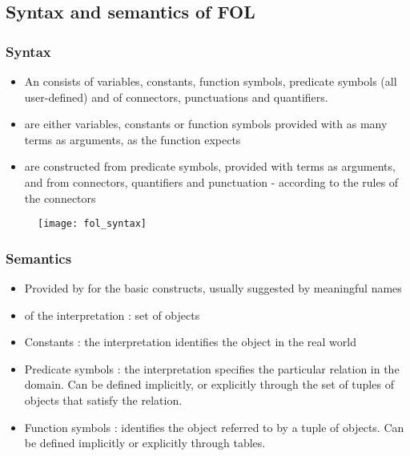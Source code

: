 \subsection{Syntax and semantics of FOL}

\subsubsection{Syntax}

\begin{minipage}{0.52\textwidth}
	\begin{itemize}
	\item An  consists of variables, constants, function symbols, predicate symbols (all user-defined) and of connectors, punctuations and quantifiers.
	\item {} are either variables, constants or function symbols provided with as many terms as arguments, as the function expects
	\item {} are constructed from predicate symbols, provided with terms as arguments, and from connectors, quantifiers and punctuation - according to the rules of the connectors
	\end{itemize}
\end{minipage}
\begin{minipage}{0.46\textwidth}
	\begin{figure}[H]
    		\centering
    		\texttt{[image: fol\_syntax]}
	\end{figure}
\end{minipage}

\subsubsection{Semantics}

\begin{itemize}
\item Provided by for the basic constructs, usually suggested by meaningful names
\item {} of the interpretation : set of objects
\item Constants : the interpretation identifies the object in the real world
\item Predicate symbols : the interpretation specifies the particular relation in the domain. Can be defined implicitly, or explicitly through the set of tuples of objects that satisfy the relation.
\item Function symbols : identifies the object referred to by a tuple of objects. Can be defined implicitly or explicitly through tables.
\end{itemize}

